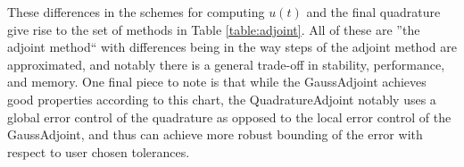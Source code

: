 These differences in the schemes for computing $u(t)$ and the final quadrature give rise to the set of methods in Table \ref{table:adjoint}. All of these are ''the adjoint method`` with differences being in the way steps of the adjoint method are approximated, and notably there is a general trade-off in stability, performance, and memory. One final piece to note is that while the GaussAdjoint achieves good properties according to this chart, the QuadratureAdjoint notably uses a global error control of the quadrature as opposed to the local error control of the GaussAdjoint, and thus can achieve more robust bounding of the error with respect to user chosen tolerances.

